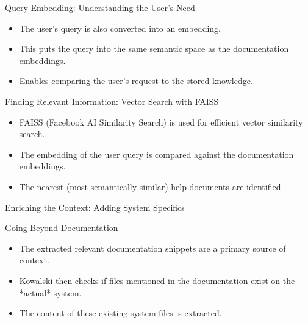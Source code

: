 \documentclass[aspectratio=169]{beamer}
\begin{document}
\begin{frame}{Query Embedding: Understanding the User's Need}
  \begin{itemize}
    \item The user's query is also converted into an embedding.
    \item This puts the query into the same semantic space as the documentation embeddings.
    \item Enables comparing the user's request to the stored knowledge.
  \end{itemize}
\end{frame}

\begin{frame}{Finding Relevant Information: Vector Search with FAISS}
  \begin{itemize}
    \item FAISS (Facebook AI Similarity Search) is used for efficient vector similarity search.
    \item The embedding of the user query is compared against the documentation embeddings.
    \item The nearest (most semantically similar) help documents are identified.
  \end{itemize}
\end{frame}

\begin{frame}{Enriching the Context: Adding System Specifics}
  \begin{block}{Going Beyond Documentation}
    \begin{itemize}
      \item The extracted relevant documentation snippets are a primary source of context.
      \item Kowalski then checks if files mentioned in the documentation exist on the *actual* system.
      \item The content of these existing system files is extracted.
    \end{itemize}
  \end{block}
\end{frame}
\end{document}
